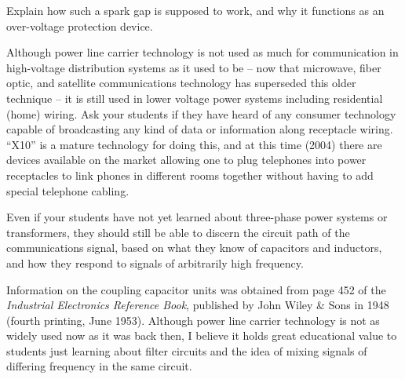 Explain how such a spark gap is supposed to work, and why it functions as an over-voltage protection device.







Although power line carrier technology is not used as much for communication in high-voltage distribution systems as it used to be -- now that microwave, fiber optic, and satellite communications technology has superseded this older technique -- it is still used in lower voltage power systems including residential (home) wiring.  Ask your students if they have heard of any consumer technology capable of broadcasting any kind of data or information along receptacle wiring.  ``X10'' is a mature technology for doing this, and at this time (2004) there are devices available on the market allowing one to plug telephones into power receptacles to link phones in different rooms together without having to add special telephone cabling.

Even if your students have not yet learned about three-phase power systems or transformers, they should still be able to discern the circuit path of the communications signal, based on what they know of capacitors and inductors, and how they respond to signals of arbitrarily high frequency.

Information on the coupling capacitor units was obtained from page 452 of the {\it Industrial Electronics Reference Book}, published by John Wiley \& Sons in 1948 (fourth printing, June 1953).  Although power line carrier technology is not as widely used now as it was back then, I believe it holds great educational value to students just learning about filter circuits and the idea of mixing signals of differing frequency in the same circuit.




